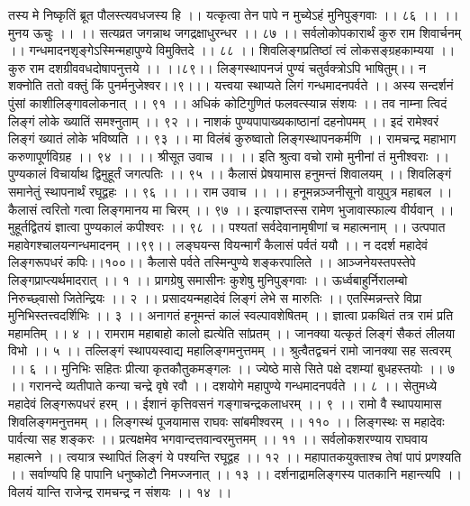 तस्य मे निष्कृतिं ब्रूत पौलस्त्यवधजस्य हि ।।
यत्कृत्वा तेन पापे न मुच्येऽहं मुनिपुङ्गवाः ।। ८६ ।।
।। मुनय ऊचुः ।। ।।
सत्यव्रत जगन्नाथ जगद्रक्षाधुरन्धर ।। ८७ ।।
सर्वलोकोपकारार्थं कुरु राम शिवार्चनम् ।।
गन्धमादनशृङ्गेऽस्मिन्महापुण्ये विमुक्तिदे ।। ८८ ।।
शिवलिङ्गप्रतिष्ठां त्वं लोकसङ्ग्रहकाम्यया ।।
कुरु राम दशग्रीववधदोषापनुत्तये ।। ।।८९।।
लिङ्गस्थापनजं पुण्यं चतुर्वक्त्रोऽपि भाषितुम्।।
न शक्नोति ततो वक्तुं किं पुनर्मनुजेश्वर।।९।।।
यत्त्वया स्थाप्यते लिगं गन्धमादनपर्वते ।।
अस्य सन्दर्शनं पुंसां काशीलिङ्गावलोकनात् ।। ९१ ।।
अधिकं कोटिगुणितं फलवत्स्यान्न संशयः ।।
तव नाम्ना त्विदं लिङ्गं लोके ख्यातिं समश्नुताम् ।। ९२ ।।
नाशकं पुण्यपापाख्यकाष्ठानां दहनोपमम् ।।
इदं रामेश्वरं लिङ्गं ख्यातं लोके भविष्यति ।। ९३ ।।
मा विलंबं कुरुष्वातो लिङ्गस्थापनकर्मणि ।।
रामचन्द्र महाभाग करुणापूर्णविग्रह ।। ९४ ।।
।। श्रीसूत उवाच ।। ।।
इति श्रुत्वा वचो रामो मुनीनां तं मुनीश्वराः ।।
पुण्यकालं विचार्याथ द्विमुहूर्तं जगत्पतिः ।। ९५ ।।
कैलासं प्रेषयामास हनुमन्तं शिवालयम् ।।
शिवलिङ्गं समानेतुं स्थापनार्थं रघूद्वहः ।। ९६ ।।
।। राम उवाच ।। ।।
हनूमन्नञ्जनीसूनो वायुपुत्र महाबल ।।
कैलासं त्वरितो गत्वा लिङ्गमानय मा चिरम् ।। ९७ ।।
इत्याज्ञप्तस्स रामेण भुजावास्फाल्य वीर्यवान् ।।
मुहूर्तद्वितयं ज्ञात्वा पुण्यकालं कपीश्वरः ।। ९८ ।।
पश्यतां सर्वदेवानामृषीणां च महात्मनाम् ।।
उत्पपात महावेगश्चालयन्गन्धमादनम् ।।९९।।
लङ्घयन्स वियन्मार्गं कैलासं पर्वतं ययौ ।।
न ददर्श महादेवं लिङ्गरूपधरं कपिः।।१००।।
कैलासे पर्वते तस्मिन्पुण्ये शङ्करपालिते ।।
आञ्जनेयस्तपस्तेपे लिङ्गप्राप्त्यर्थमादरात् ।। १ ।।
प्रागग्रेषु समासीनः कुशेषु मुनिपुङ्गवाः ।।
ऊर्ध्वबाहुर्निरालम्बो निरुच्छ्वासो जितेन्द्रियः ।। २ ।।
प्रसादयन्महादेवं लिङ्गं लेभे स मारुतिः ।।
एतस्मिन्नन्तरे विप्रा मुनिभिस्तत्त्वदर्शिभिः ।। ३ ।।
अनागतं हनूमन्तं कालं स्वल्पावशेषितम् ।।
ज्ञात्वा प्रकथितं तत्र रामं प्रति महामतिम् ।। ४ ।।
रामराम महाबाहो कालो ह्यत्येति सांप्रतम् ।।
जानक्या यत्कृतं लिङ्गं सैकतं लीलया विभो ।। ५ ।।
तल्लिङ्गं स्थापयस्वाद्य महालिङ्गमनुत्तमम् ।।
श्रुत्वैतद्वचनं रामो जानक्या सह सत्वरम् ।। ६ ।।
मुनिभिः सहितः प्रीत्या कृतकौतुकमङ्गलः ।।
ज्येष्ठे मासे सिते पक्षे दशम्यां बुधहस्तयोः ।। ७ ।।
गरानन्दे व्यतीपाते कन्या चन्द्रे वृषे रवौ ।।
दशयोगे महापुण्ये गन्धमादनपर्वते ।। ८ ।।
सेतुमध्ये महादेवं लिङ्गरूपधरं हरम् ।।
ईशानं कृत्तिवसनं गङ्गाचन्द्रकलाधरम् ।। ९ ।।
रामो वै स्थापयामास शिवलिङ्गमनुत्तमम् ।।
लिङ्गस्थं पूजयामास राघवः सांबमीश्वरम् ।। ११० ।।
लिङ्गस्थः स महादेवः पार्वत्या सह शङ्करः ।।
प्रत्यक्षमेव भगवान्दत्तवान्वरमुत्तमम् ।। ११ ।।
सर्वलोकशरण्याय राघवाय महात्मने ।।
त्वयात्र स्थापितं लिङ्गं ये पश्यन्ति रघूद्वह ।। १२ ।।
महापातकयुक्ताश्च तेषां पापं प्रणश्यति ।।
सर्वाण्यपि हि पापानि धनुष्कोटौ निमज्जनात् ।। १३ ।।
दर्शनाद्रामलिङ्गस्य पातकानि महान्त्यपि ।।
विलयं यान्ति राजेन्द्र रामचन्द्र न संशयः ।। १४ ।।
